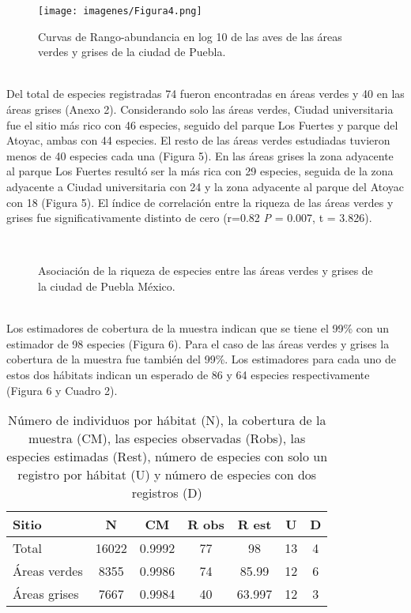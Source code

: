 \documentclass[letterpaper,12pt]{article}
\begin{document}
\begin{center}
\begin{figure}[h!]
\texttt{[image: imagenes/Figura4.png]}\\
\caption[Curvas  de Rango-abundancia de los sitios de estudio.]{Curvas de Rango-abundancia en log 10 de  las aves de las  áreas verdes y grises de la ciudad de Puebla.}
\end{figure}
\end{center}\\[5cm]


Del total de especies registradas 74 fueron encontradas en áreas verdes y 40 en las áreas grises (Anexo 2). Considerando solo las áreas verdes, Ciudad universitaria fue el sitio más rico con 46 especies, seguido del parque Los Fuertes y parque del Atoyac, ambas con 44 especies. El resto de las áreas verdes estudiadas tuvieron menos de 40 especies cada una (Figura 5).
En las áreas grises la zona adyacente al parque Los Fuertes resultó ser la más rica con 29 especies, seguida  de la zona adyacente a Ciudad universitaria con 24 y la zona adyacente al parque del Atoyac con 18 (Figura 5). El índice de correlación entre la riqueza de las  áreas verdes y grises fue significativamente distinto de cero  (r=0.82 \textit{P} = 0.007, t = 3.826). 

\begin{center}
\begin{figure}[h!]
\\
\caption[Asociación de la riqueza de especies en las áreas verdes y grises]{Asociación de la riqueza de especies entre las áreas verdes y grises de la ciudad de Puebla México.}
\end{figure}
\end{center}\\[5cm]

Los estimadores de cobertura de la muestra indican que se tiene el 99\% con un estimador de 98 especies (Figura 6). Para el caso de las áreas verdes y grises la cobertura de la muestra fue también del 99\%. Los estimadores para cada uno de estos dos hábitats indican un esperado  de 86 y 64 especies respectivamente (Figura 6 y Cuadro 2).

{\footnotesize
\begin{longtable}[c] {lcccccc} 
\caption[Estimadores y cobertura de la muestra]{ Número de individuos por hábitat (N), la  cobertura de la muestra (CM), las especies observadas (Robs), las especies estimadas (Rest), número de especies con solo un registro por hábitat (U) y número de especies con dos registros (D) } \\
Sitio & N &CM & R obs  & R est & U & D   \\ \midrule
Total & 16022 & 0.9992 & 77 & 98 & 13 & 4 \\
Áreas verdes & 8355 & 0.9986 & 74 & 85.99 & 12 & 6 \\
Áreas grises & 7667 & 0.9984 & 40 & 63.997 & 12 & 3 \\ \bottomrule
\end{longtable}
}\\[5cm]
\end{document}
